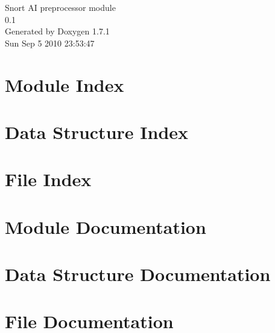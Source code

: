 \documentclass[a4paper]{book}
\begin{document}
\hypersetup{pageanchor=false}
\begin{titlepage}
\vspace*{7cm}
\begin{center}
{\Large Snort AI preprocessor module \\[1ex]\large 0.1 }\\
\vspace*{1cm}
{\large Generated by Doxygen 1.7.1}\\
\vspace*{0.5cm}
{\small Sun Sep 5 2010 23:53:47}\\
\end{center}
\end{titlepage}
\clearemptydoublepage
{}
\tableofcontents
\clearemptydoublepage
{}
\hypersetup{pageanchor=true}
\chapter{Module Index}

\chapter{Data Structure Index}

\chapter{File Index}

\chapter{Module Documentation}





\chapter{Data Structure Documentation}







\chapter{File Documentation}











\printindex
\end{document}
